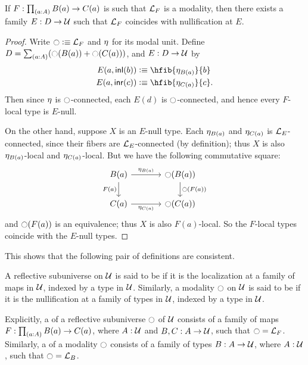 \begin{lem}\label{thm:acc-modal}
  If $F:\prd{a:A} B(a)\to C(a)$ is such that $\localization{F}$ is a modality, then there exists a family $E:D\to \UU$ such that $\localization{F}$ coincides with nullification at $E$.
\end{lem}
\begin{proof}
  Write $\modal\defeq\localization{F}$ and $\modalunit$ for its modal unit.
  Define $D = \sm{a:A} (\modal (B(a)) + \modal(C(a)))$, and $E:D\to \UU$ by
  \begin{align*}
    E(a,\inl(b)) &\defeq \hfib{\modalunit[B(a)]}{b}\\
    E(a,\inr(c)) &\defeq \hfib{\modalunit[C(a)]}{c}.
  \end{align*}
  Then since $\modalunit$ is $\modal$-connected, each $E(d)$ is $\modal$-connected, and hence every $F$-local type is $E$-null.

  On the other hand, suppose $X$ is an $E$-null type.
  Each $\modalunit[B(a)]$ and $\modalunit[C(a)]$ is $\localization{E}$-connected, since their fibers are $\localization{E}$-connected (by definition); thus $X$ is also $\modalunit[B(a)]$-local and $\modalunit[C(a)]$-local.
  But we have the following commutative square:
  \[
  \begin{tikzcd}[column sep=large]
    B(a) \ar[r,"{\modalunit[B(a)]}"] \ar[d,"F(a)"'] & \modal(B(a)) \ar[d,"{\modal(F(a))}"]\\
    C(a) \ar[r,"{\modalunit[C(a)]}"'] & \modal(C(a))
  \end{tikzcd}
  \]
  and ${\modal(F(a))}$ is an equivalence; thus $X$ is also $F(a)$-local.
  So the $F$-local types coincide with the $E$-null types.
\end{proof}

This shows that the following pair of definitions are consistent.

\begin{defn}\label{defn:accessible}
A reflective subuniverse on $\UU$ is said to be  if it is the localization at a family of maps in $\UU$, indexed by a type in $\UU$.
Similarly, a modality $\modal$ on $\UU$ is said to be  if it is the nullification at a family of types in $\UU$, indexed by a type in $\UU$.

Explicitly, a  of a reflective subuniverse $\modal$ of $\UU$ consists of a family of maps $F : \prd{a:A} B(a) \to C(a)$, where $A:\UU$ and $B,C:A\to\UU$, such that $\modal = \localization{F}$.
Similarly, a  of a modality $\modal$ consists of a family of types $B: A\to\UU$, where $A:\UU$, such that $\modal = \localization{B}$.
\end{defn}

